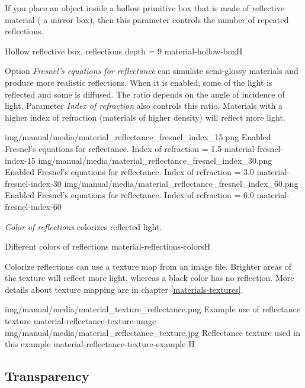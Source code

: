 If you place an object inside a hollow primitive box that is made of reflective material ( a mirror box), then this parameter controls the number of repeated reflections.

{Hollow reflective box, reflections depth = 9}
{material-hollow-box}{H}

Option \emph{Fresnel's equations for reflectance} can simulate semi-glossy materials and produce more realistic reflections. When it is enabled, some of the light is reflected and some is diffused. The ratio depends on the angle of incidence of light. Parameter \emph{Index of refraction} also controls this ratio. Materials with a higher index of refraction (materials of higher density) will reflect more light. 

\threeImagesWithTwoCaptionsFullWidth
{img/manual/media/material_reflectance_fresnel_index_15.png}
{Enabled Fresnel's equations for reflectance. Index of refraction = 1.5}
{material-fresnel-index-15}
{img/manual/media/material_reflectance_fresnel_index_30.png}
{Enabled Fresnel's equations for reflectance. Index of refraction = 3.0}
{material-fresnel-index-30}
{img/manual/media/material_reflectance_fresnel_index_60.png}
{Enabled Fresnel's equations for reflectance. Index of refraction = 6.0}
{material-fresnel-index-60}

\emph{Color of reflections} colorizes reflected light.

{Different colors of reflections}
{material-reflections-colors}{H}

Colorize reflections can use a texture map from an image file. Brighter areas of the texture will reflect more light, whereas a black color has no reflection. More details about texture mapping are in chapter \ref{materials-textures}.

\twoImagesWithTwoCaptionsFullWidth
{img/manual/media/material_texture_reflectance.png}
{Example use of reflectance texture}
{material-reflectance-texture-usage}
{img/manual/media/material_reflectance_texture.jpg}
{Reflectance texture used in this example}
{material-reflectance-texture-example}
{H}

\pagebreak
\subsection{Transparency}\label{materials-transparency}

